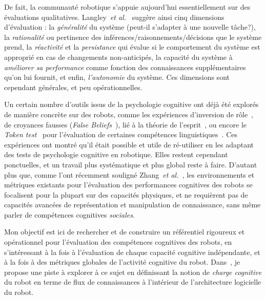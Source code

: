 \documentclass[a4paper]{article}
\newcommand{\etal}{{\textit{et al.~}}}
\begin{document}
De fait, la communauté robotique s'appuie aujourd'hui essentiellement sur des
évaluations qualitatives. Langley~\etal\cite{Langley2006} suggère ainsi cinq
dimensions d'évaluation : la \emph{généralité} du système (peut-il s'adapter à
une nouvelle tâche?), la \emph{rationalité} ou pertinence des
inférences/raisonnements/décisions que le système prend, la \emph{réactivité} et
la \emph{persistance} qui évalue si le comportement du système est approprié en
cas de changements non-anticipés, la capacité du système à \emph{améliorer sa
performance} comme fonction des connaissances supplémentaires qu'on lui fournit,
et enfin, \emph{l'autonomie} du système. Ces dimensions sont cependant
générales, et peu opérationnelles.

Un certain nombre d'outils issus de la psychologie cognitive ont déjà été
explorés de manière concrète sur des robots, comme les expériences d'inversion
de rôle~\cite{Lallee2010b}, de croyances fausses (\emph{False
Beliefs}~\cite{Leslie2000}), lié à la théorie de l'esprit~\cite{Breazeal2006,
warnier2012when, trafton2013act}, ou encore le \emph{Token
test}~\cite{DiSimoni1978} pour l'évaluation de certaines compétences
linguistiques~\cite{Mavridis2006}. Ces expériences ont montré qu'il était
possible et utile de ré-utiliser en les adaptant des tests de psychologie
cognitive en robotique. Elles restent cependant ponctuelles, et un travail plus
systématique et plus global reste à faire. D'autant plus que, comme l'ont
récemment souligné Zhang~\etal\cite{zhang2013evaluation}, les environnements et
métriques existants pour l'évaluation des performances cognitives des robots se
focalisent pour la plupart sur des capacités physiques, et ne requièrent pas de
capacités avancées de représentation et manipulation de connaissance, sans même
parler de compétences cognitives \emph{sociales}.


Mon objectif est ici de rechercher et de construire un référentiel rigoureux et
opérationnel pour l'évaluation des compétences cognitives des robots, en
s'intéressant à la fois à l'évaluation de chaque capacité cognitive
indépendante, et à la fois à des métriques globales de l'activité cognitive du
robot. Dans~\cite{lemaignan2013explicit}, je propose une piste à explorer à ce
sujet en définissant la notion de \emph{charge cognitive} du robot en terme de
flux de connaissances à l'intérieur de l'architecture logicielle du robot.
\end{document}
